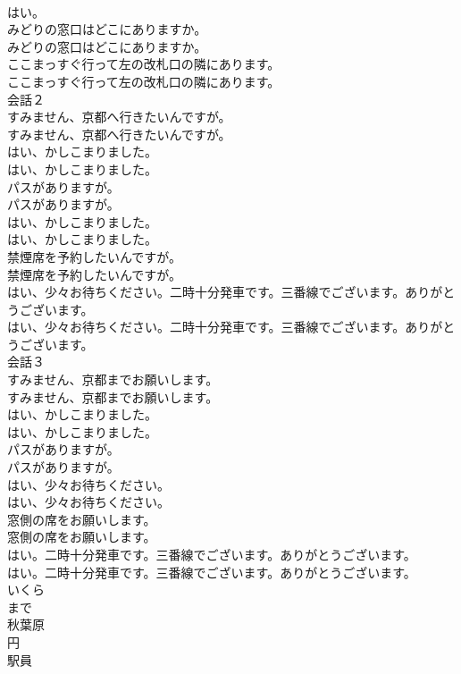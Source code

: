 \documentclass[8pt]{extreport}
\begin{document}
\begin{CJK}{UTF8}{min}
\\	はい。 
\\	みどりの窓口はどこにありますか。	
\\	みどりの窓口はどこにありますか。 
\\	ここまっすぐ行って左の改札口の隣にあります。	
\\	ここまっすぐ行って左の改札口の隣にあります。 
\\	会話２	
\\	すみません、京都へ行きたいんですが。	
\\	すみません、京都へ行きたいんですが。 
\\	はい、かしこまりました。	
\\	はい、かしこまりました。 
\\	パスがありますが。	
\\	パスがありますが。 
\\	はい、かしこまりました。	
\\	はい、かしこまりました。 
\\	禁煙席を予約したいんですが。	
\\	禁煙席を予約したいんですが。 
\\	はい、少々お待ちください。二時十分発車です。三番線でございます。ありがとうございます。	
\\	はい、少々お待ちください。二時十分発車です。三番線でございます。ありがとうございます。 
\\	会話３	
\\	すみません、京都までお願いします。	
\\	すみません、京都までお願いします。 
\\	はい、かしこまりました。	
\\	はい、かしこまりました。 
\\	パスがありますが。	
\\	パスがありますが。 
\\	はい、少々お待ちください。	
\\	はい、少々お待ちください。 
\\	窓側の席をお願いします。	
\\	窓側の席をお願いします。 
\\	はい。二時十分発車です。三番線でございます。ありがとうございます。	
\\	はい。二時十分発車です。三番線でございます。ありがとうございます。 
\\	いくら
\\	まで
\\	秋葉原
\\	円
\\	駅員

\end{CJK}
\end{document}
